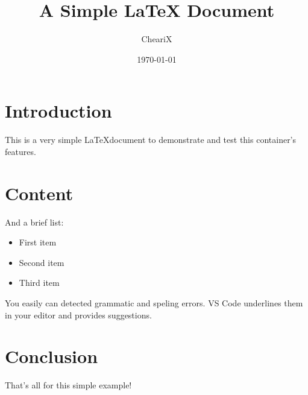 \documentclass{article}
\begin{document}
\title{A Simple LaTeX Document}
\author{CheariX}
\date{\today}

\maketitle

\section{Introduction}
This is a very simple \LaTeX document to demonstrate and test this container's features.

\section{Content}

And a brief list:
\begin{itemize}
    \item First item
    \item Second item
    \item Third item
\end{itemize}
You easily can detected grammatic and speling errors. %
VS Code underlines them in your editor and provides suggestions.

\section{Conclusion}
That's all for this simple example!
\end{document}
